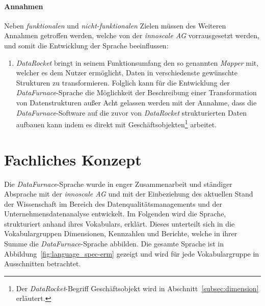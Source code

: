\documentclass[
  language=german, %
  type=bachelor%
]{isthesis}
\begin{document}
\begin{content}
  \paragraph{Annahmen} Neben \textit{funktionalen} und \textit{nicht-funktionalen} Zielen müssen des
  Weiteren Annahmen getroffen werden, welche von der \textit{innoscale AG}
  vorrausgesetzt werden, und somit die Entwicklung der Sprache beeinflussen:
  \begin{enumerate}
    \item \textit{DataRocket} bringt in seinem Funktionsumfang den so genannten
      \textit{Mapper} mit, welcher es dem Nutzer ermöglicht, Daten in
      verschiedenste gewünschte Strukturen zu transformieren. Folglich kann für
      die Entwicklung der \textit{DataFurnace}-Sprache die Möglichkeit der
      Beschreibung einer Transformation von Datenstrukturen außer Acht gelassen
      werden mit der Annahme, dass die \textit{DataFurnace}-Software auf die
      zuvor von \textit{DataRocket} strukturierten Daten aufbauen kann indem es
      direkt mit Geschäftsobjekten\footnote{Der \textit{DataRocket}-Begriff
      Geschäftsobjekt wird in Abschnitt~\ref{subsec:dimension} erläutert.}
      arbeitet.
  \end{enumerate}


  \section{Fachliches Konzept}

  Die \textit{DataFurnace}-Sprache wurde in enger Zusammenarbeit und ständiger
  Absprache mit der \textit{innoscale AG} und mit der Einbeziehung des
  aktuellen Stand der Wissenschaft im Bereich des Datenqualitätsmanagements und
  der Unternehmensdatenanalyse entwickelt. Im Folgenden wird die Sprache,
  strukturiert anhand ihres Vokabulars, erklärt. Dieses unterteilt sich in die
  Vokabulargruppen Dimensionen, Kennzahlen und Berichte, welche in ihrer Summe
  die \textit{DataFurnace}-Sprache abbilden. Die gesamte Sprache ist in
  Abbildung~\ref{fig:language_spec-erm} gezeigt und wird für jede
  Vokabulargruppe in Ausschnitten betrachtet.

  \begin{figure}[caption={Metamodell der \textit{DataFurnace}-Sprache}, label={fig:language_spec-erm}]
    \resizebox{\columnwidth}{!}{}
  \end{figure}


\end{content}
\end{document}
